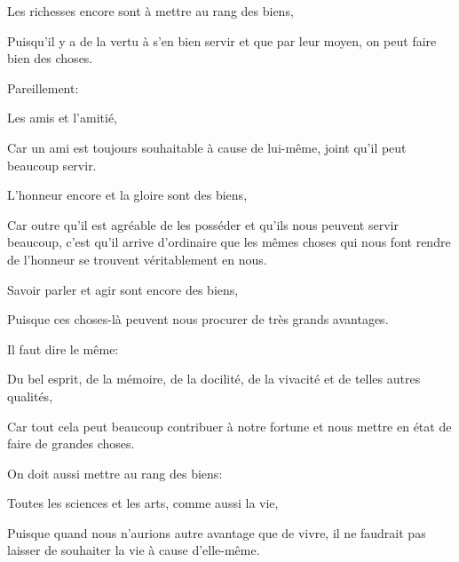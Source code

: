 \bigbreak

\begin{lieu}
	Les richesses encore sont à mettre au rang des biens, 
\end{lieu}

Puisqu'il y a de la vertu à s'en bien servir et que par leur moyen, on peut faire bien des choses.

\bigbreak

Pareillement:

\begin{lieu}
	Les amis et l'amitié,
\end{lieu}

Car un ami est toujours souhaitable à cause de lui-même, joint qu'il peut beaucoup servir.

\bigbreak

\begin{lieu}
	L'honneur encore et la gloire sont des biens,
\end{lieu}

Car outre qu'il est agréable de les posséder et qu'ils nous peuvent servir beaucoup, c'est qu'il arrive d'ordinaire que les mêmes choses
qui nous font rendre de l'honneur se trouvent véritablement en nous.

\bigbreak

\begin{lieu}
	Savoir parler et agir sont encore des biens,
\end{lieu}

Puisque ces choses-là peuvent nous procurer de très grands avantages. 

\bigbreak

Il faut dire le même:

\begin{lieu}
	Du bel esprit, de la mémoire, de la docilité, de la vivacité et de telles autres qualités,
\end{lieu}

Car tout cela peut beaucoup contribuer à notre fortune et nous mettre en état de faire de grandes choses. 

\bigbreak

On doit aussi mettre au rang des biens:

\begin{lieu}
	Toutes les sciences et les arts, comme aussi la vie,
\end{lieu}

Puisque quand nous n'aurions autre avantage que de vivre, il ne faudrait pas laisser de souhaiter la vie à cause d'elle-même.

